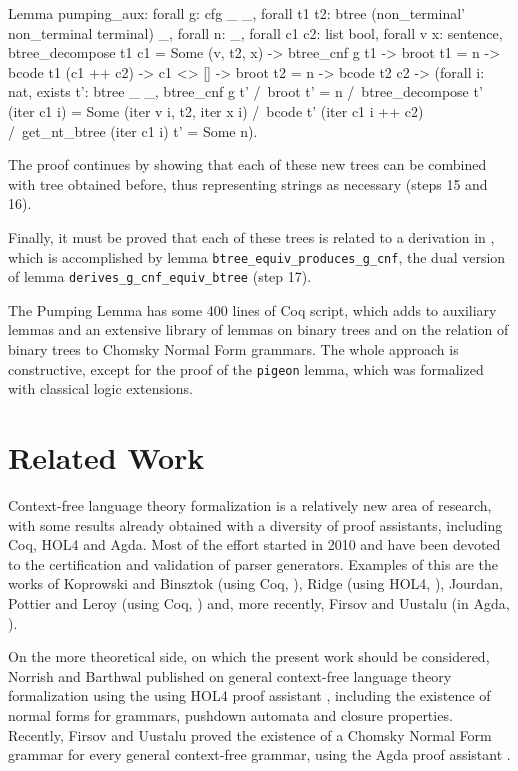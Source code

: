 \documentclass {elsarticle}
\begin{document}
\begin{coq}
Lemma pumping_aux:
forall g: cfg _ _,
forall t1 t2: btree (non_terminal' non_terminal terminal) _,
forall n: _,
forall c1 c2: list bool,
forall v x: sentence,
btree_decompose t1 c1 = Some (v, t2, x) ->
btree_cnf g t1 ->
broot t1 = n ->
bcode t1 (c1 ++ c2) ->
c1 <> [] ->
broot t2 = n ->
bcode t2 c2 ->
(forall i: nat,
 exists t': btree _ _,
 btree_cnf g t' /\
 broot t' = n /\
 btree_decompose t' (iter c1 i) = Some (iter v i, t2, iter x i) /\
 bcode t' (iter c1 i ++ c2) /\
 get_nt_btree (iter c1 i) t' = Some n).
\end{coq}

The proof continues by showing that each of these new trees can be combined with tree  obtained before, thus representing strings  as necessary (steps 15 and 16). 

Finally, it must be proved that each of these trees is related to a derivation in , which is accomplished by lemma \texttt {btree\_equiv\_produces\_g\_cnf}, the dual version of lemma \texttt {derives\_g\_cnf\_equiv\_btree} (step 17).

The Pumping Lemma has some 400 lines of Coq script, which adds to auxiliary lemmas and an extensive library of lemmas on binary trees and on the relation of binary trees to Chomsky Normal Form grammars. The whole approach is constructive, except for the proof of the \texttt {pigeon} lemma, which was formalized with classical logic extensions.

\section {Related Work}
\label {sec-related}
Context-free language theory formalization is a relatively new area of research, with some results already obtained with a diversity of proof assistants, including Coq, HOL4 and Agda. Most of the effort started in 2010 and have been devoted to the certification and validation of parser generators. Examples of this are the works of Koprowski and Binsztok (using Coq, \cite {koprowski-2010}), Ridge (using HOL4, \cite {ridge-2011}), Jourdan, Pottier and Leroy (using Coq, \cite {jourdan-2012}) and, more recently, Firsov and Uustalu (in Agda, \cite {firsov-2014}). 

On the more theoretical side, on which the present work should be considered, Norrish and Barthwal published on general context-free language theory formalization using the using HOL4 proof assistant \cite {barthwal-norrish-2010a,barthwal-norrish-2010b,barthwal-norrish-2013}, including the existence of normal forms for grammars, pushdown automata and closure properties. Recently, Firsov and Uustalu proved the existence of a Chomsky Normal Form grammar for every general context-free grammar, using the Agda proof assistant \cite {firsov-2015}.
\end{document}
